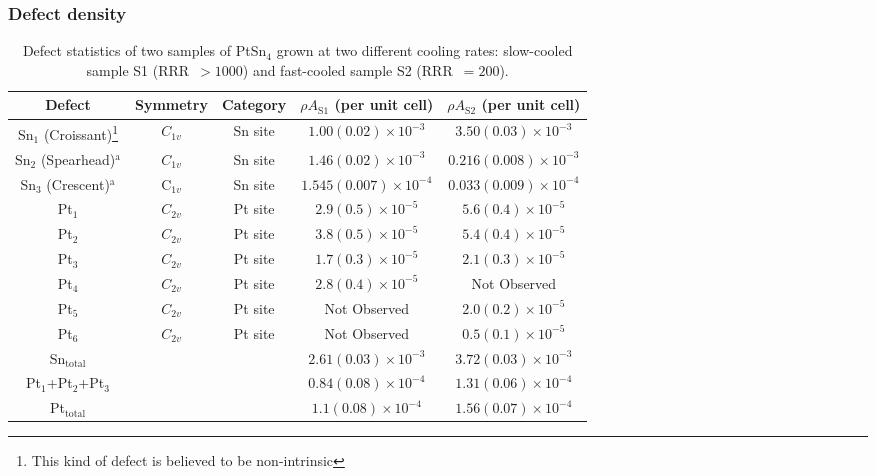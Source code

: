 \subsubsection{Defect density}

\begin{table*}
		\renewcommand{\arraystretch}{1.5}  %
		\caption{Defect statistics of two samples of PtSn$_4$ grown at two different cooling rates: slow-cooled sample S1 (RRR~$>1000$) and fast-cooled sample S2 (RRR~$=200$).} \label{tab:table1}
		\begin{tabular}{ccccc}
			Defect & Symmetry & Category & $\rho A_{\text{S1}}$ (per unit cell) & $\rho A_{\text{S2}}$ (per unit cell) \\ 
			\hline
			Sn$_1$ (Croissant)\footnote{This kind of defect is believed to be non-intrinsic} & $C_{1v}$ & Sn site & $1.00(0.02) \times 10^{-3}$ & $3.50(0.03) \times 10^{-3}$ \\
			Sn$_2$ (Spearhead)$^{\text{a}}$ & $C_{1v}$ & Sn site & $1.46(0.02) \times 10^{-3}$ & $0.216(0.008) \times 10^{-3}$ \\
			Sn$_3$ (Crescent)$^{\text{a}}$ & C$_{1v}$ & Sn site & $1.545(0.007) \times 10^{-4}$ & $0.033(0.009) \times 10^{-4}$ \\
			\hline
			Pt$_1$ & $C_{2v}$ & Pt site & $2.9(0.5) \times 10^{-5}$ & $5.6(0.4) \times 10^{-5}$ \\
			Pt$_2$ & $C_{2v}$ & Pt site & $3.8(0.5) \times 10^{-5}$ & $5.4(0.4) \times 10^{-5}$ \\
			Pt$_3$ & $C_{2v}$ & Pt site & $1.7(0.3) \times 10^{-5}$ & $2.1(0.3) \times 10^{-5}$ \\
			Pt$_4$ & $C_{2v}$ & Pt site & $2.8(0.4) \times 10^{-5}$ & Not Observed \\
			Pt$_5$ & $C_{2v}$ & Pt site & Not Observed & $2.0(0.2) \times 10^{-5}$ \\
			Pt$_6$ & $C_{2v}$ & Pt site & Not Observed & $0.5(0.1) \times 10^{-5}$ \\
			\hline
			Sn$_{\text{total}}$ &  &  & $2.61(0.03) \times 10^{-3}$ & $3.72(0.03) \times 10^{-3}$ \\
			Pt$_1$+Pt$_2$+Pt$_3$ &  &  & $0.84(0.08) \times 10^{-4}$ & $1.31(0.06) \times 10^{-4}$ \\
			Pt$_{\text{total}}$ &  &  & $1.1(0.08) \times 10^{-4}$ & $1.56(0.07) \times 10^{-4}$ \\
		\end{tabular}
\end{table*}

